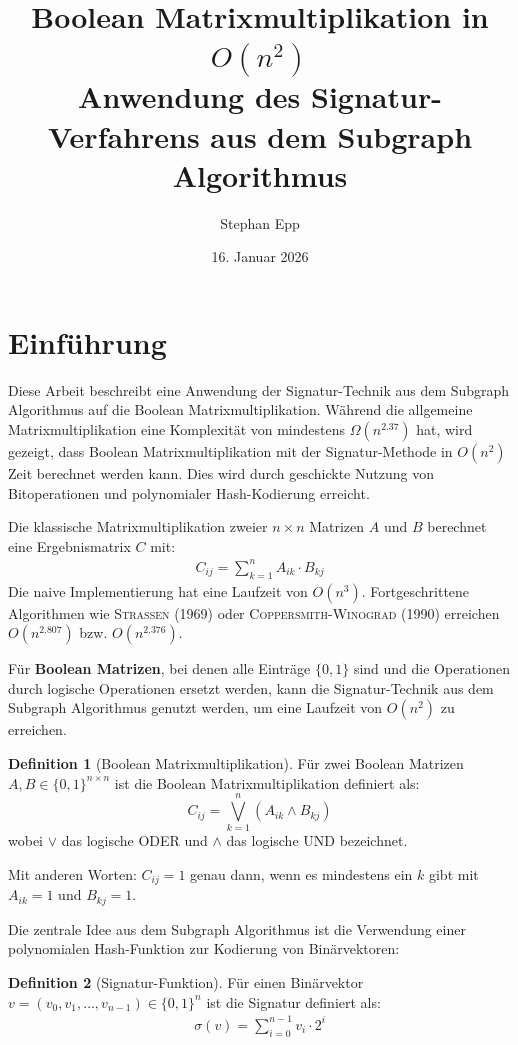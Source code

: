 ﻿\documentclass[a4paper,12pt]{article}
\title{Boolean Matrixmultiplikation in $O(n^2)$ \\
	\large Anwendung des Signatur-Verfahrens aus dem Subgraph Algorithmus}
\author{Stephan Epp}
\date{16. Januar 2026}
\theoremstyle{definition}
\newtheorem{definition}{Definition}
\begin{document}
	
\maketitle

\tableofcontents
\newpage

\section{Einführung}
Diese Arbeit beschreibt eine Anwendung der Signatur-Technik aus dem Subgraph Algorithmus auf die Boolean Matrixmultiplikation. Während die allgemeine Matrixmultiplikation eine Komplexität von mindestens $\Omega(n^{2.37})$ hat, wird gezeigt, dass Boolean Matrixmultiplikation mit der Signatur-Methode in $O(n^2)$ Zeit berechnet werden kann. Dies wird durch geschickte Nutzung von Bitoperationen und polynomialer Hash-Kodierung erreicht.

Die klassische Matrixmultiplikation zweier $n \times n$ Matrizen $A$ und $B$ berechnet eine Ergebnismatrix $C$ mit:
\begin{align}
	C_{ij} = \sum_{k=1}^{n} A_{ik} \cdot B_{kj}
\end{align}
Die naive Implementierung hat eine Laufzeit von $O(n^3)$. Fortgeschrittene Algorithmen wie \textsc{Strassen} (1969) oder \textsc{Coppersmith-Winograd} (1990) erreichen $O(n^{2.807})$ bzw. $O(n^{2.376})$.

Für \textbf{Boolean Matrizen}, bei denen alle Einträge $\{0, 1\}$ sind und die Operationen durch logische Operationen ersetzt werden, kann die Signatur-Technik aus dem Subgraph Algorithmus genutzt werden, um eine Laufzeit von $O(n^2)$ zu erreichen.

\begin{definition}[Boolean Matrixmultiplikation]
	Für zwei Boolean Matrizen $A, B \in \{0,1\}^{n \times n}$ ist die Boolean Matrixmultiplikation definiert als:
	\[
	C_{ij} = \bigvee_{k=1}^{n} (A_{ik} \wedge B_{kj})
	\]
	wobei $\vee$ das logische ODER und $\wedge$ das logische UND bezeichnet.
\end{definition}

Mit anderen Worten: $C_{ij} = 1$ genau dann, wenn es mindestens ein $k$ gibt mit $A_{ik} = 1$ und $B_{kj} = 1$.

Die zentrale Idee aus dem Subgraph Algorithmus ist die Verwendung einer polynomialen Hash-Funktion zur Kodierung von Binärvektoren:

\begin{definition}[Signatur-Funktion]
	Für einen Binärvektor $v = (v_0, v_1, \ldots, v_{n-1}) \in \{0,1\}^n$ ist die Signatur definiert als:
	\begin{align}
		\sigma(v) = \sum_{i=0}^{n-1} v_i \cdot 2^i
	\end{align}
\end{definition}
\end{document}
